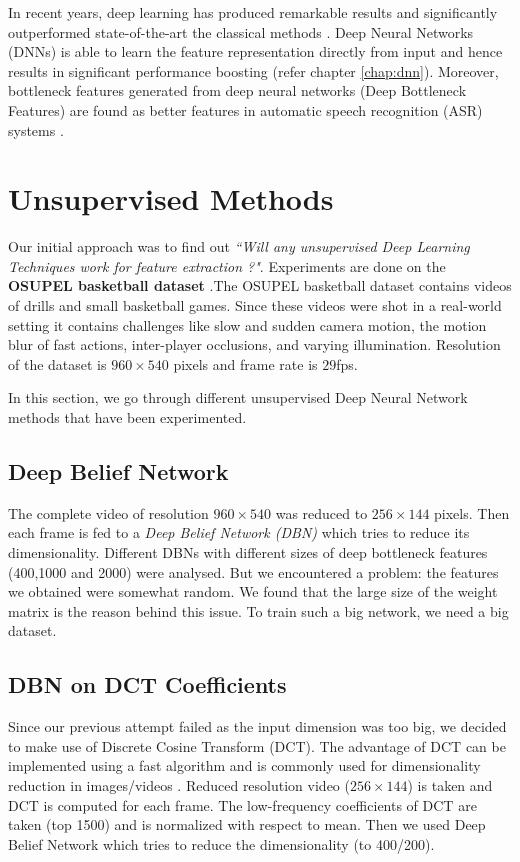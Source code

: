 In recent years, deep learning has produced remarkable results and significantly outperformed state-of-the-art the classical methods \cite{KarpathyCVPR14}. Deep Neural Networks (DNNs) is able to learn the feature representation directly from input and hence results in significant performance boosting (refer chapter \ref{chap:dnn}). Moreover, bottleneck features generated from deep neural networks (Deep Bottleneck Features) are found as better features in automatic speech recognition (ASR) systems \cite{yu2011improved,gehring2013extracting}.

\section{Unsupervised Methods}
\label{sec:event:unsupervised}
Our initial approach was to find out \textit{``Will any unsupervised Deep Learning Techniques work for feature extraction ?"}. Experiments are done on the \textbf{OSUPEL basketball dataset} \cite{brendel2011probabilistic}.The OSUPEL basketball dataset contains videos of drills and small basketball games. Since these videos were shot in a real-world setting it contains challenges like slow and sudden camera motion, the motion blur of fast actions, inter-player occlusions, and varying illumination. Resolution of the dataset is $960 \times 540$ pixels and frame rate is $29$fps.

In this section, we go through different unsupervised Deep Neural Network methods that have been experimented. 

\subsection{Deep Belief Network} 
The complete video of resolution $960 \times 540$ was reduced to $256 \times 144$ pixels. Then each frame is fed to a \textit{Deep Belief Network (DBN)} which tries to reduce its dimensionality. Different DBNs with different sizes of deep bottleneck features (400,1000 and 2000) were analysed. But we encountered a problem: the features we obtained were somewhat random. We found that the large size of the weight matrix is the reason behind this issue. To train such a big network, we need a big dataset.

\subsection{DBN on DCT Coefficients}
Since our previous attempt failed as the input dimension was too big, we decided to make use of Discrete Cosine Transform (DCT). The advantage of DCT can be implemented using a fast algorithm and is commonly used for dimensionality reduction in images/videos \cite{er2005high}. Reduced resolution video ($256 \times 144$) is taken and DCT is computed for each frame. The low-frequency coefficients of DCT are taken (top 1500) and is normalized with respect to mean. Then we used Deep Belief Network which tries to reduce the dimensionality (to 400/200).

